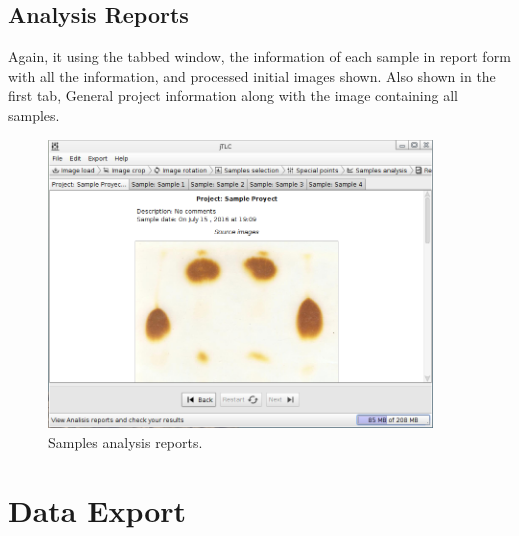 \section{Analysis Reports}
Again, it using the tabbed window, the information of each sample in report form with all the information, and processed initial images shown. Also shown in the first tab, General project information along with the image containing all samples.
\begin{figure}[H]
	\vspace{0cm}
	\centering
	\includegraphics[width=385px]{imagenes/reports}
	\centering
	\vspace{-0.4cm}
	\caption{Samples analysis reports.}
	\label{fig:image_analysis_reports}
	\vspace{-0.25cm}
\end{figure}
\newpage

\chapter{Data Export}
